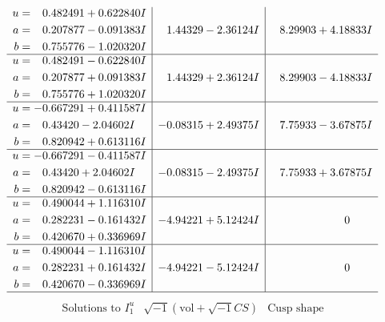 \documentclass[1p]{elsarticle_modified}
\theoremstyle{definition}
\newcommand{\I}{\sqrt{-1}}
\begin{document}
$$\begin{array}{c|c|c}
\begin{aligned}
u &= \phantom{-}0.482491 + 0.622840 I \\
a &= \phantom{-}0.207877 - 0.091383 I \\
b &= \phantom{-}0.755776 - 1.020320 I\end{aligned}
 & \phantom{-}1.44329 - 2.36124 I & \phantom{-}8.29903 + 4.18833 I \\ \hline\begin{aligned}
u &= \phantom{-}0.482491 - 0.622840 I \\
a &= \phantom{-}0.207877 + 0.091383 I \\
b &= \phantom{-}0.755776 + 1.020320 I\end{aligned}
 & \phantom{-}1.44329 + 2.36124 I & \phantom{-}8.29903 - 4.18833 I \\ \hline\begin{aligned}
u &= -0.667291 + 0.411587 I \\
a &= \phantom{-}0.43420 - 2.04602 I \\
b &= \phantom{-}0.820942 + 0.613116 I\end{aligned}
 & -0.08315 + 2.49375 I & \phantom{-}7.75933 - 3.67875 I \\ \hline\begin{aligned}
u &= -0.667291 - 0.411587 I \\
a &= \phantom{-}0.43420 + 2.04602 I \\
b &= \phantom{-}0.820942 - 0.613116 I\end{aligned}
 & -0.08315 - 2.49375 I & \phantom{-}7.75933 + 3.67875 I \\ \hline\begin{aligned}
u &= \phantom{-}0.490044 + 1.116310 I \\
a &= \phantom{-}0.282231 - 0.161432 I \\
b &= \phantom{-}0.420670 + 0.336969 I\end{aligned}
 & -4.94221 + 5.12424 I & \phantom{-0.000000 } 0 \\ \hline\begin{aligned}
u &= \phantom{-}0.490044 - 1.116310 I \\
a &= \phantom{-}0.282231 + 0.161432 I \\
b &= \phantom{-}0.420670 - 0.336969 I\end{aligned}
 & -4.94221 - 5.12424 I & \phantom{-0.000000 } 0\\
 \hline 
 \end{array}$$\newpage$$\begin{array}{c|c|c}  
\text{Solutions to }I^u_{1}& \I (\text{vol} + \sqrt{-1}CS) & \text{Cusp shape}\\

\end{array}$$
\end{document}
